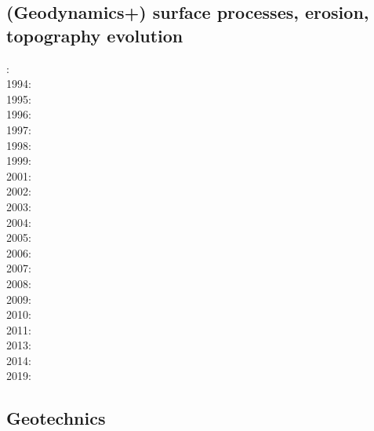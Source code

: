 \subsection*{(Geodynamics+) surface processes, erosion, topography evolution}

: \cite{befh92}\\
1994: \cite{howa94}\cite{koon94}\cite{kobe94}\\
1995: \cite{chmm95}\cite{koon95}\\
1996: \cite{avbu96}\cite{bekh96}\\
1997: \cite{brsa97}\cite{gaft97}\cite{babr97}\\
1998: \cite{deea98}\cite{vabr98}\\
1999: \cite{will99a}\cite{bupi99}\cite{babr99}\\
2001: \cite{zemk01}\cite{tulg01}\cite{brsh01}\cite{bupo01}\cite{coul01}\cite{crda01}\\
2002: \cite{wibr02}\cite{mobr02}\cite{garc02}\\
2003: \cite{brau03}\\
2004: \cite{fijj04}\cite{gocl04}\\
2005: \cite{lave05}\cite{will05}\\
2006: \cite{rosw06}\cite{brau06gsl}\cite{bocr06}\\
2007: \cite{buto07}\cite{sebp07}\\
2008: \cite{alle08}\cite{rowf08}\\
2009: \cite{whip09}\cite{kuhe09}\cite{makh09}\\
2010: \cite{will10}\cite{tuha10}\cite{brau10b}\cite{brau10}\cite{brya10}\cite{cmwt10}\\
2011: \cite{robr11}\cite{grhd11}\\
2013: \cite{vehc13}\cite{brwi13}\cite{fihv13a}\cite{fihv13b}\cite{brrs13}\cite{chgz13} \\
2014: \cite{crbr14}\cite{cokm14}\cite{erhv14}\cite{erhv15} \\
2019: \cite{anpa19}

\subsection*{Geotechnics}

\noindent
\cite{ster99}
\cite{gora03}
\cite{zhll03}
\cite{gour04}
\cite{gork06}
\cite{bufy14}

